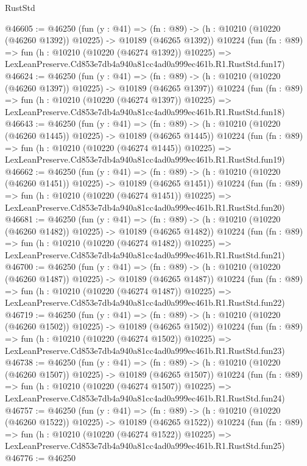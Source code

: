 \begin{lexlean}{RustStd}
\begin{coremodule}
@46605 := @46250
    (fun (y : @41) =>
    (fn : @89) -> (h : @10210 (@10220 (@46260 @1392)) @10225) -> @10189 (@46265 @1392))
    @10224
    (fun (fn : @89) =>
    fun (h : @10210 (@10220 (@46274 @1392)) @10225) =>
    LexLeanPreserve.Cd853e7db4a940a81cc4ad0a999ec461b.R1.RustStd.fun17)
@46624 := @46250
    (fun (y : @41) =>
    (fn : @89) -> (h : @10210 (@10220 (@46260 @1397)) @10225) -> @10189 (@46265 @1397))
    @10224
    (fun (fn : @89) =>
    fun (h : @10210 (@10220 (@46274 @1397)) @10225) =>
    LexLeanPreserve.Cd853e7db4a940a81cc4ad0a999ec461b.R1.RustStd.fun18)
@46643 := @46250
    (fun (y : @41) =>
    (fn : @89) -> (h : @10210 (@10220 (@46260 @1445)) @10225) -> @10189 (@46265 @1445))
    @10224
    (fun (fn : @89) =>
    fun (h : @10210 (@10220 (@46274 @1445)) @10225) =>
    LexLeanPreserve.Cd853e7db4a940a81cc4ad0a999ec461b.R1.RustStd.fun19)
@46662 := @46250
    (fun (y : @41) =>
    (fn : @89) -> (h : @10210 (@10220 (@46260 @1451)) @10225) -> @10189 (@46265 @1451))
    @10224
    (fun (fn : @89) =>
    fun (h : @10210 (@10220 (@46274 @1451)) @10225) =>
    LexLeanPreserve.Cd853e7db4a940a81cc4ad0a999ec461b.R1.RustStd.fun20)
@46681 := @46250
    (fun (y : @41) =>
    (fn : @89) -> (h : @10210 (@10220 (@46260 @1482)) @10225) -> @10189 (@46265 @1482))
    @10224
    (fun (fn : @89) =>
    fun (h : @10210 (@10220 (@46274 @1482)) @10225) =>
    LexLeanPreserve.Cd853e7db4a940a81cc4ad0a999ec461b.R1.RustStd.fun21)
@46700 := @46250
    (fun (y : @41) =>
    (fn : @89) -> (h : @10210 (@10220 (@46260 @1487)) @10225) -> @10189 (@46265 @1487))
    @10224
    (fun (fn : @89) =>
    fun (h : @10210 (@10220 (@46274 @1487)) @10225) =>
    LexLeanPreserve.Cd853e7db4a940a81cc4ad0a999ec461b.R1.RustStd.fun22)
@46719 := @46250
    (fun (y : @41) =>
    (fn : @89) -> (h : @10210 (@10220 (@46260 @1502)) @10225) -> @10189 (@46265 @1502))
    @10224
    (fun (fn : @89) =>
    fun (h : @10210 (@10220 (@46274 @1502)) @10225) =>
    LexLeanPreserve.Cd853e7db4a940a81cc4ad0a999ec461b.R1.RustStd.fun23)
@46738 := @46250
    (fun (y : @41) =>
    (fn : @89) -> (h : @10210 (@10220 (@46260 @1507)) @10225) -> @10189 (@46265 @1507))
    @10224
    (fun (fn : @89) =>
    fun (h : @10210 (@10220 (@46274 @1507)) @10225) =>
    LexLeanPreserve.Cd853e7db4a940a81cc4ad0a999ec461b.R1.RustStd.fun24)
@46757 := @46250
    (fun (y : @41) =>
    (fn : @89) -> (h : @10210 (@10220 (@46260 @1522)) @10225) -> @10189 (@46265 @1522))
    @10224
    (fun (fn : @89) =>
    fun (h : @10210 (@10220 (@46274 @1522)) @10225) =>
    LexLeanPreserve.Cd853e7db4a940a81cc4ad0a999ec461b.R1.RustStd.fun25)
@46776 := @46250

\end{coremodule}
\end{lexlean}
